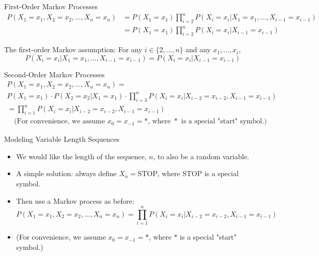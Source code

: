 \documentclass[10pt]{beamer}
\begin{document}
\begin{frame}{First-Order Markov Processes}
    \scriptsize
    \begin{align*}
        P(X_1 = x_1, X_2 = x_2, \ldots, X_n = x_n) &= P(X_1 = x_1) \prod_{i=2}^{n} P(X_i = x_i|X_1 = x_1, \ldots, X_{i-1} = x_{i-1}) \\
        &= P(X_1 = x_1) \prod_{i=2}^{n} P(X_i = x_i|X_{i-1} = x_{i-1})
    \end{align*}
    
    The first-order Markov assumption: For any $i \in \{2, \ldots, n\}$ and any $x_1, \ldots, x_i$,
    \[
    P(X_i = x_i|X_1 = x_1, \ldots, X_{i-1} = x_{i-1}) = P(X_i = x_i|X_{i-1} = x_{i-1})
    \]
\end{frame}

\begin{frame}{Second-Order Markov Processes}
    \scriptsize
    \begin{align*}
        P(X_1 = x_1, X_2 = x_2, \ldots, X_n = x_n) = \\  P(X_1 = x_1) \cdot P(X_2 = x_2|X_1 = x_1) \cdot \prod_{i=3}^{n} P(X_i = x_i|X_{i-2} = x_{i-2}, X_{i-1} = x_{i-1}) \\
        = \prod_{i=1}^{n} P(X_i = x_i|X_{i-2} = x_{i-2}, X_{i-1} = x_{i-1}) \\
        \quad \text{(For convenience, we assume $x_0 = x_{-1} = *$, where $*$ is a special "start" symbol.)}
    \end{align*}
    
    
    
\end{frame}

\begin{frame}{Modeling Variable Length Sequences}
    \scriptsize
    \begin{itemize}
        \item We would like the length of the sequence, $n$, to also be a random variable.
        \item A simple solution: always define $X_n = \text{STOP}$, where STOP is a special symbol.
        \item Then use a Markov process as before:
        \[
            P(X_1 = x_1, X_2 = x_2, \ldots, X_n = x_n) = \prod_{i=1}^{n} P(X_i = x_i|X_{i-2} = x_{i-2}, X_{i-1} = x_{i-1})
        \]
        \item (For convenience, we assume $x_0 = x_{-1} = *$, where $*$ is a special "start" symbol.)
    \end{itemize}
\end{frame}
\end{document}
